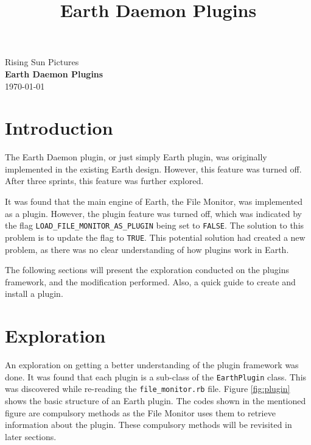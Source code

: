 \documentclass{article}
\title{Earth Daemon Plugins}
\begin{document}
\begin{titlepage}
    \begin{center}
        Rising Sun Pictures \\
        \vspace{3cm}
        {\LARGE\bf Earth Daemon Plugins} \\
        \vspace{5cm}
        \today
    \end{center}
\end{titlepage}

\tableofcontents
\listoffigures

\newpage

\section{Introduction} %
\label{sec:introduction}

The Earth Daemon plugin, or just simply Earth plugin, was originally implemented in the existing Earth design. However, this feature was turned off. After three sprints, this feature was further explored. 

It was found that the main engine of Earth, the File Monitor, was implemented as a plugin. However, the plugin feature was turned off, which was indicated by the flag \texttt{LOAD\_FILE\_MONITOR\_AS\_PLUGIN} being set to \texttt{FALSE}. The solution to this problem is to update the flag to \texttt{TRUE}. This potential solution had created a new problem, as there was no clear understanding of how plugins work in Earth. 

The following sections will present the exploration conducted on the plugins framework, and the modification performed. Also, a quick guide to create and install a plugin. 


\section{Exploration} %
\label{sec:exploration}

An exploration on getting a better understanding of the plugin framework was done. It was found that each plugin is a sub-class of the \texttt{EarthPlugin} class. This was discovered while re-reading the \texttt{file\_monitor.rb} file. Figure \ref{fig:plugin} shows the basic structure of an Earth plugin. The codes shown in the mentioned figure are compulsory methods as the File Monitor uses them to retrieve information about the plugin. These compulsory methods will be revisited in later sections. 
\end{document}
